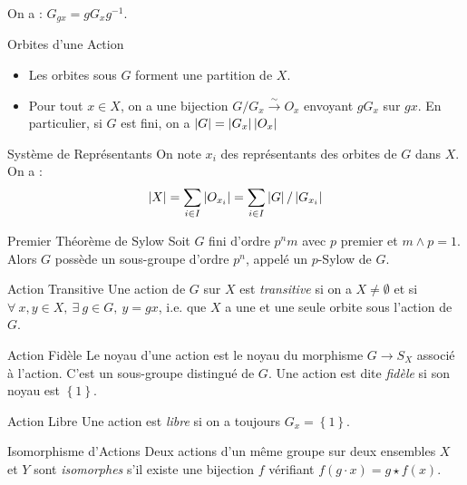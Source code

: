 \documentclass{cours}
\begin{document}
\begin{lemma}
    On a : $G_{gx} = gG_{x}g^{-1}$.
\end{lemma}

\begin{propositionfr}{Orbites d'une Action}{}
    \begin{itemize}
        \item Les orbites sous $G$ forment une partition de $X$.
        \item Pour tout $x \in X$, on a une bijection $G/G_{x} \xrightarrow{\sim} O_{x}$ envoyant $gG_{x}$ sur $gx$. En particulier, si $G$ est fini, on a $\left|G\right| = \left|G_{x}\right|\left|O_{x}\right|$
    \end{itemize}
\end{propositionfr}

\begin{corollaire}{Système de Représentants}{}
    On note $x_{i}$ des représentants des orbites de $G$ dans $X$. On a :
    \[
        \left|X\right| = \sum_{i\in I} \left|O_{x_{i}}\right| = \sum_{i\in I} \left|G\right|/\left|G_{x_{i}}\right|
    \]
\end{corollaire}

\begin{théorème}{Premier Théorème de Sylow}{}
    Soit $G$ fini d'ordre $p^{n}m$ avec $p$ premier et $m \wedge p = 1$. Alors $G$ possède un sous-groupe d'ordre $p^{n}$, appelé un $p$-Sylow de $G$.
\end{théorème}

\begin{définition}{Action Transitive}{}
    Une action de $G$ sur $X$ est \emph{transitive} si on a $X \neq \emptyset$ et si $\forall\ x, y \in X,\ \exists \ g \in G, \ y = gx$, i.e. que $X$ a une et une seule orbite sous l'action de $G$.
\end{définition}

\begin{définition}{Action Fidèle}{}
    Le noyau d'une action est le noyau du morphisme $G \rightarrow S_{X}$ associé à l'action. C'est un sous-groupe distingué de $G$. Une action est dite \emph{fidèle} si son noyau est $\left\{1\right\}$.
\end{définition}

\begin{définition}{Action Libre}{}
    Une action est \emph{libre} si on a toujours $G_{x} = \left\{1\right\}$.
\end{définition}

\begin{définition}{Isomorphisme d'Actions}{}
    Deux actions d'un même groupe sur deux ensembles $X$ et $Y$ sont \emph{isomorphes} s'il existe une bijection $f$ vérifiant $f(g \cdot x) = g \star f(x)$.
\end{définition}
\end{document}
